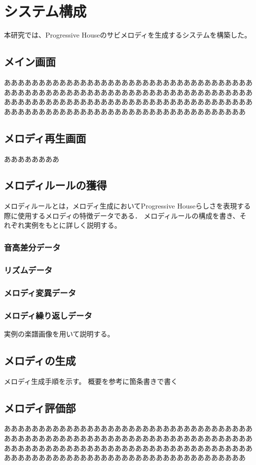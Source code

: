 \chapter{システム構成}
本研究では、Progressive Houseのサビメロディを生成するシステムを構築した。

\section{メイン画面}
あああああああああああああああああああああああああああああああああああああああああああああああああああああああああああああああああああああああああああああああああああああああああああああああああああああああああああああああああああああああああああああああああああああああああああああああ

\section{メロディ再生画面}
ああああああああ


\section{メロディルールの獲得}
メロディルールとは，メロディ生成においてProgressive Houseらしさを表現する際に使用するメロディの特徴データである．
メロディルールの構成を書き、それぞれ実例をもとに詳しく説明する。
\subsection{音高差分データ}
\subsection{リズムデータ}
\subsection{メロディ変異データ}
\subsection{メロディ繰り返しデータ}
実例の楽譜画像を用いて説明する。

\section{メロディの生成}
メロディ生成手順を示す。
概要を参考に箇条書きで書く


\section{メロディ評価部}
あああああああああああああああああああああああああああああああああああああああああああああああああああああああああああああああああああああああああああああああああああああああああああああああああああああああああああああああああああああああああああああああああああああああああああああああ

